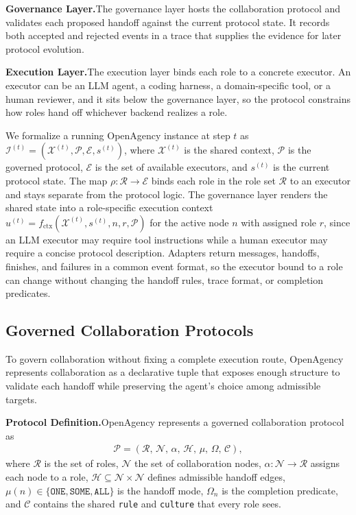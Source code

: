 \documentclass{article} %
\begin{document}
\textbf{Governance Layer.}\quad The governance layer hosts the collaboration protocol and validates each proposed handoff against the current protocol state. It records both accepted and rejected events in a trace that supplies the evidence for later protocol evolution.

\textbf{Execution Layer.}\quad The execution layer binds each role to a concrete executor. An executor can be an LLM agent, a coding harness, a domain-specific tool, or a human reviewer, and it sits below the governance layer, so the protocol constrains how roles hand off whichever backend realizes a role.

We formalize a running OpenAgency instance at step $t$ as $\mathcal{I}^{(t)} = (\mathcal{X}^{(t)}, \mathcal{P}, \mathcal{E}, s^{(t)})$, where $\mathcal{X}^{(t)}$ is the shared context, $\mathcal{P}$ is the governed protocol, $\mathcal{E}$ is the set of available executors, and $s^{(t)}$ is the current protocol state. The map $\rho: \mathcal{R}\rightarrow\mathcal{E}$ binds each role in the role set $\mathcal{R}$ to an executor and stays separate from the protocol logic. The governance layer renders the shared state into a role-specific execution context $u^{(t)} = f_{\mathrm{ctx}}(\mathcal{X}^{(t)}, s^{(t)}, n, r, \mathcal{P})$ for the active node $n$ with assigned role $r$, since an LLM executor may require tool instructions while a human executor may require a concise protocol description. Adapters return messages, handoffs, finishes, and failures in a common event format, so the executor bound to a role can change without changing the handoff rules, trace format, or completion predicates.

\subsection{Governed Collaboration Protocols}
\label{sec:protocol}

To govern collaboration without fixing a complete execution route, OpenAgency represents collaboration as a declarative tuple that exposes enough structure to validate each handoff while preserving the agent's choice among admissible targets.

\textbf{Protocol Definition.}\quad OpenAgency represents a governed collaboration protocol as
\begin{gather}
    \mathcal{P} = (\mathcal{R},\, \mathcal{N},\, \alpha,\, \mathcal{H},\, \mu,\, \Omega,\, \mathcal{C}),
\end{gather}
where $\mathcal{R}$ is the set of roles, $\mathcal{N}$ the set of collaboration nodes, $\alpha\colon \mathcal{N}\to\mathcal{R}$ assigns each node to a role, $\mathcal{H}\subseteq\mathcal{N}\times\mathcal{N}$ defines admissible handoff edges, $\mu(n)\in\{\texttt{ONE},\texttt{SOME},\texttt{ALL}\}$ is the handoff mode, $\Omega_n$ is the completion predicate, and $\mathcal{C}$ contains the shared \texttt{rule} and \texttt{culture} that every role sees.
\end{document}
